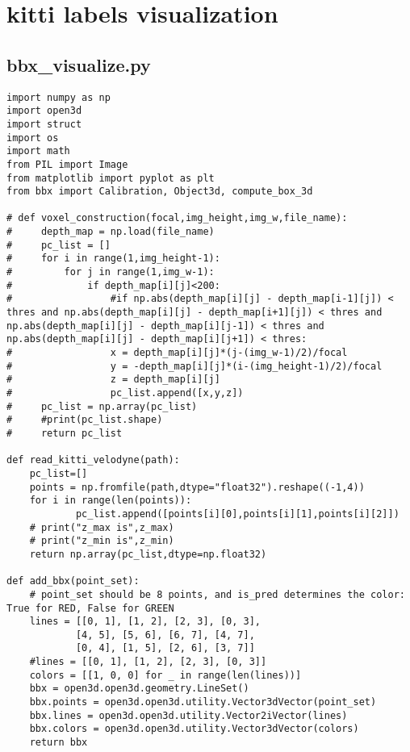 \section*{kitti labels visualization}
\subsection*{bbx_visualize.py}
\begin{lstlisting}
import numpy as np
import open3d
import struct
import os
import math
from PIL import Image
from matplotlib import pyplot as plt
from bbx import Calibration, Object3d, compute_box_3d

# def voxel_construction(focal,img_height,img_w,file_name):
#     depth_map = np.load(file_name)
#     pc_list = []
#     for i in range(1,img_height-1):
#         for j in range(1,img_w-1):
#             if depth_map[i][j]<200:
#                 #if np.abs(depth_map[i][j] - depth_map[i-1][j]) < thres and np.abs(depth_map[i][j] - depth_map[i+1][j]) < thres and np.abs(depth_map[i][j] - depth_map[i][j-1]) < thres and np.abs(depth_map[i][j] - depth_map[i][j+1]) < thres:
#                 x = depth_map[i][j]*(j-(img_w-1)/2)/focal
#                 y = -depth_map[i][j]*(i-(img_height-1)/2)/focal
#                 z = depth_map[i][j]
#                 pc_list.append([x,y,z])
#     pc_list = np.array(pc_list)
#     #print(pc_list.shape)
#     return pc_list

def read_kitti_velodyne(path):
    pc_list=[]
    points = np.fromfile(path,dtype="float32").reshape((-1,4))
    for i in range(len(points)):
            pc_list.append([points[i][0],points[i][1],points[i][2]])
    # print("z_max is",z_max)
    # print("z_min is",z_min)       
    return np.array(pc_list,dtype=np.float32)

def add_bbx(point_set):
    # point_set should be 8 points, and is_pred determines the color: True for RED, False for GREEN
    lines = [[0, 1], [1, 2], [2, 3], [0, 3],
            [4, 5], [5, 6], [6, 7], [4, 7],
            [0, 4], [1, 5], [2, 6], [3, 7]]
    #lines = [[0, 1], [1, 2], [2, 3], [0, 3]]
    colors = [[1, 0, 0] for _ in range(len(lines))]
    bbx = open3d.open3d.geometry.LineSet()
    bbx.points = open3d.open3d.utility.Vector3dVector(point_set)
    bbx.lines = open3d.open3d.utility.Vector2iVector(lines)
    bbx.colors = open3d.open3d.utility.Vector3dVector(colors)
    return bbx


\end{lstlisting}
